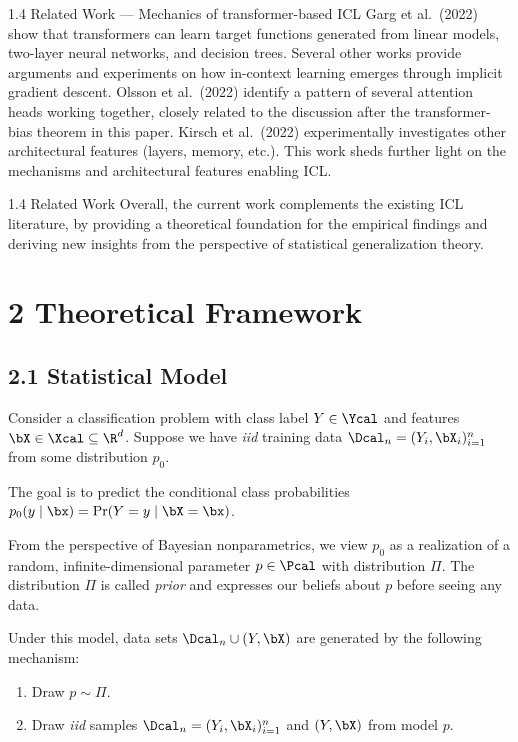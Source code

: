 \documentclass[aspectratio=169,10pt]{beamer}
\newcommand{\currentheading}{\ifx\insertsubsection\empty\insertsection\else\insertsubsection\fi}
\begin{document}
\begin{frame}{1.4 Related Work --- Mechanics of transformer-based ICL}
Garg et al.\ (2022) show that transformers can learn target functions generated from linear models, two-layer neural networks, and decision trees. Several other works provide arguments and experiments on how in-context learning emerges through implicit gradient descent. Olsson et al.\ (2022) identify a pattern of several attention heads working together, closely related to the discussion after the transformer-bias theorem in this paper. Kirsch et al.\ (2022) experimentally investigates other architectural features (layers, memory, etc.). This work sheds further light on the mechanisms and architectural features enabling ICL.
\end{frame}

\begin{frame}{1.4 Related Work}
Overall, the current work complements the existing ICL literature, by providing a theoretical foundation for the empirical findings and deriving new insights from the perspective of statistical generalization theory.
\end{frame}

\section{2 Theoretical Framework}
\subsection{2.1 Statistical Model}

\begin{frame}{\currentheading}
Consider a classification problem with class label $Y \in \Ycal$ and features $\bX \in \Xcal \subseteq \R^d$. Suppose we have \emph{iid} training data $\Dcal_n = (Y_{i}, \bX_{ i})_{i = 1}^{n}$ from some distribution $p_0$.

The goal is to predict the conditional class probabilities $p_0(y \mid \bx) = \Pr(Y = y \mid \bX = \bx)$.

From the perspective of Bayesian nonparametrics, we view $p_0$ as a realization of a random, infinite-dimensional parameter $p \in \Pcal$ with distribution $\Pi$. The distribution $\Pi$ is called \emph{prior} and expresses our beliefs about $p$ before seeing any data.
\end{frame}

\begin{frame}{\currentheading}
Under this model, data sets $\Dcal_n \cup (Y, \bX)$ are generated by the following mechanism:
\begin{enumerate}
	\item Draw $p \sim \Pi$.
	\item Draw \emph{iid} samples $\Dcal_n = (Y_i, \bX_i)_{i = 1}^n$ and $(Y, \bX)$ from model $p$.
\end{enumerate}
\end{frame}
\end{document}

